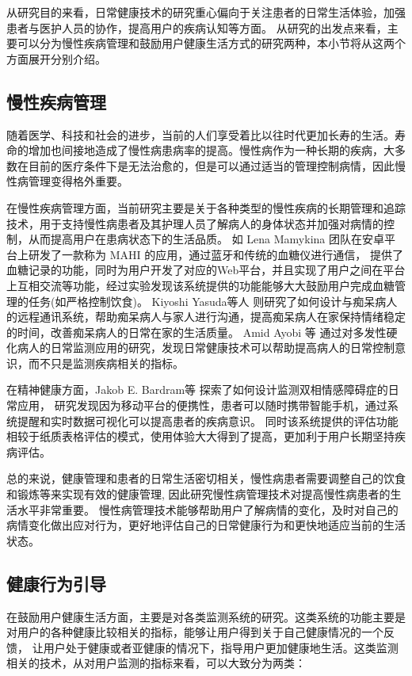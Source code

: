 从研究目的来看，日常健康技术的研究重心偏向于关注患者的日常生活体验，加强患者与医护人员的协作，提高用户的疾病认知等方面\cite{nunes2015self-care}。
从研究的出发点来看，主要可以分为慢性疾病管理和鼓励用户健康生活方式的研究两种\cite{nunes2015self-care}，本小节将从这两个方面展开分别介绍。

\subsection{慢性疾病管理}
随着医学、科技和社会的进步，当前的人们享受着比以往时代更加长寿的生活\cite{OlshanskyDEMOGRAPHY}。寿命的增加也间接地造成了慢性病患病率的提高\cite{kaye2006overview}。慢性病作为一种长期的疾病，大多数在目前的医疗条件下是无法治愈的，但是可以通过适当的管理控制病情，因此慢性病管理变得格外重要\cite{Ben2002A}。

在慢性疾病管理方面，当前研究主要是关于各种类型的慢性疾病的长期管理和追踪技术，用于支持慢性病患者及其护理人员了解病人的身体状态并加强对病情的控制，从而提高用户在患病状态下的生活品质。
如 Lena Mamykina \cite{mamykina2008mahi:}团队在安卓平台上研发了一款称为 MAHI 的应用，通过蓝牙和传统的血糖仪进行通信，
提供了血糖记录的功能，同时为用户开发了对应的Web平台，并且实现了用户之间在平台上互相交流等功能，经过实验发现该系统提供的功能能够大大鼓励用户完成血糖管理的任务(如严格控制饮食)。
Kiyoshi Yasuda等人 \cite{yasuda2009remote}则研究了如何设计与痴呆病人的远程通讯系统，帮助痴呆病人与家人进行沟通，提高痴呆病人在家保持情绪稳定的时间，改善痴呆病人的日常在家的生活质量。
Amid Ayobi 等\cite{ayobi2017quantifying} 通过对多发性硬化病人的日常监测应用的研究，发现日常健康技术可以帮助提高病人的日常控制意识，而不只是监测疾病相关的指标。

在精神健康方面，Jakob E. Bardram等 \cite{bardram2013designing}探索了如何设计监测双相情感障碍症的日常应用， 研究发现因为移动平台的便携性，患者可以随时携带智能手机，通过系统提醒和实时数据可视化可以提高患者的疾病意识。
同时该系统提供的评估功能相较于纸质表格评估的模式，使用体验大大得到了提高，更加利于用户长期坚持疾病评估。

总的来说，健康管理和患者的日常生活密切相关，慢性病患者需要调整自己的饮食和锻炼等来实现有效的健康管理\cite{nunes2018understanding}, 因此研究慢性病管理技术对提高慢性病患者的生活水平非常重要。
慢性病管理技术能够帮助用户了解病情的变化，及时对自己的病情变化做出应对行为，更好地评估自己的日常健康行为和更快地适应当前的生活状态\cite{ayobi2017quantifying}。


\subsection{健康行为引导}
在鼓励用户健康生活方面，主要是对各类监测系统的研究。这类系统的功能主要是对用户的各种健康比较相关的指标，能够让用户得到关于自己健康情况的一个反馈，
让用户处于健康或者亚健康的情况下，指导用户更加健康地生活。这类监测相关的技术，从对用户监测的指标来看，可以大致分为两类：

